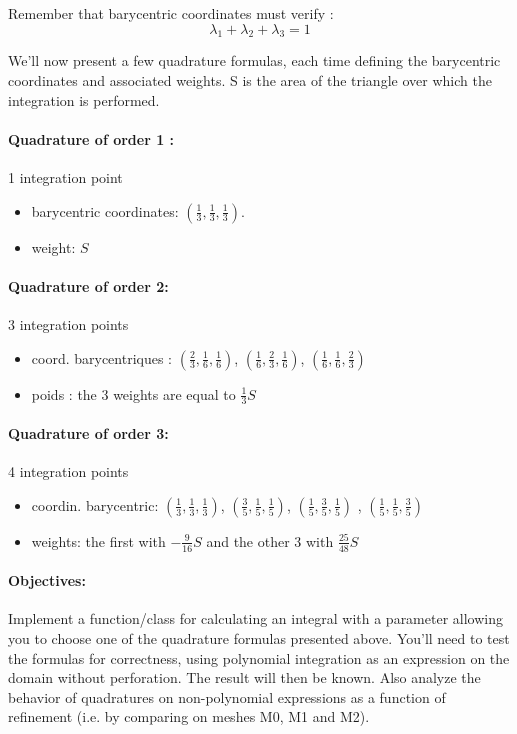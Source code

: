 \documentclass[english,10pt,a4paper]{article}
\begin{document}
Remember that barycentric coordinates must verify :
\begin{equation*}
  \lambda_1 + \lambda_2 + \lambda_3 = 1
\end{equation*}


We'll now present a few quadrature formulas, each time defining the barycentric coordinates and associated weights.
S is the area of the triangle over which the integration is performed.

\paragraph{Quadrature of order 1 :} 1 integration point
\begin{itemize}
\item barycentric coordinates: $\left(\frac{1}{3},\frac{1}{3},\frac{1}{3}\right)$.
\item weight: $S$
\end{itemize}

\paragraph{Quadrature of order 2:} 3 integration points
\begin{itemize}
\item coord. barycentriques : $\left(\frac{2}{3},\frac{1}{6},\frac{1}{6}\right)$, $\left(\frac{1}{6},\frac{2}{3},\frac{1}{6}\right)$, $\left(\frac{1}{6},\frac{1}{6},\frac{2}{3}\right)$
\item poids : the 3 weights are equal to $\frac{1}{3} S$
\end{itemize}

\paragraph{Quadrature of order 3:} 4 integration points
\begin{itemize}
\item coordin. barycentric: $\left(\frac{1}{3},\frac{1}{3},\frac{1}{3}\right)$,
  $\left(\frac{3}{5},\frac{1}{5},\frac{1}{5}\right)$,
  $\left(\frac{1}{5},\frac{3}{5},\frac{1}{5}\right)$ ,
  $\left(\frac{1}{5},\frac{1}{5},\frac{3}{5}\right)$
\item weights: the first with $-\frac{9}{16} S$ and the other 3 with $\frac{25}{48} S$
\end{itemize}

\paragraph{Objectives:} Implement a function/class for calculating an integral with a parameter allowing you to choose one of the quadrature formulas presented above.
You'll need to test the formulas for correctness, using polynomial integration as an expression on the domain without perforation. The result will then be known.
Also analyze the behavior of quadratures on non-polynomial expressions as a function of refinement (i.e. by comparing on meshes M0, M1 and M2).
\end{document}
